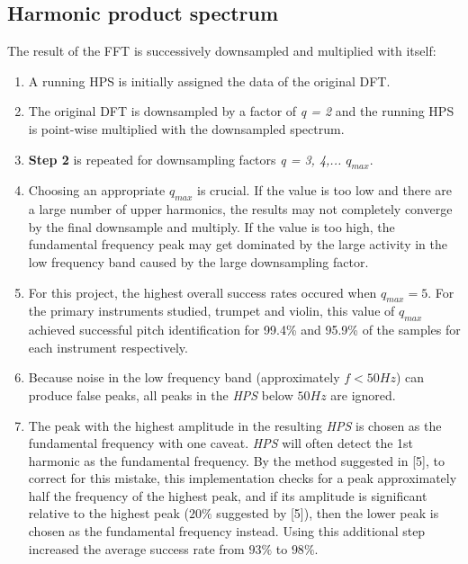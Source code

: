 \documentclass[12pt]{article}
\begin{document}
\subsection{Harmonic product spectrum}
The result of the FFT is successively downsampled and multiplied with itself:
\begin{enumerate}
	\item A running HPS is initially assigned the data of the original DFT.
	\item The original DFT is downsampled by a factor of \textit{q = 2} and the running HPS is point-wise multiplied with the downsampled spectrum.
	\item \textbf{Step 2} is repeated for downsampling factors \textit{q = 3, 4,... $q_{max}$}.
	\item Choosing an appropriate $q_{max}$ is crucial. If the value is too low and there are a large number of upper harmonics, the results may not completely converge by the final downsample and multiply. If the value is too high, the fundamental frequency peak may get dominated by the large activity in the low frequency band caused by the large downsampling factor.
	\item For this project, the highest overall success rates occured when $q_{max}=5$. For the primary instruments studied, trumpet and violin, this value of $q_{max}$ achieved successful pitch identification for 99.4\% and 95.9\% of the samples for each instrument respectively.
	\item Because noise in the low frequency band (approximately $f<50Hz$) can produce false peaks, all peaks in the \textit{HPS} below $50Hz$ are ignored.
	\item The peak with the highest amplitude in the resulting \textit{HPS} is chosen as the fundamental frequency with one caveat. \textit{HPS} will often detect the 1st harmonic as the fundamental frequency. By the method suggested in [5], to correct for this mistake, this implementation checks for a peak approximately half the frequency of the highest peak, and if its amplitude is significant relative to the highest peak ($20\%$ suggested by [5]), then the lower peak is chosen as the fundamental frequency instead. Using this additional step increased the average success rate from $93\%$ to $98\%$.
\end{enumerate}
	
\end{document}

